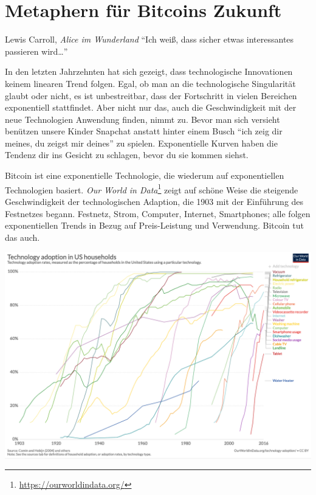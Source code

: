 \chapter{Metaphern für Bitcoins Zukunft}
\label{les:21}

\begin{chapquote}{Lewis Carroll, \textit{Alice im Wunderland}}
\enquote{Ich weiß, dass sicher etwas interessantes passieren wird\ldots}
\end{chapquote}

In den letzten Jahrzehnten hat sich gezeigt, dass technologische Innovationen
keinem linearen Trend folgen. Egal, ob man an die technologische Singularität
glaubt oder nicht, es ist unbestreitbar, dass der Fortschritt in vielen
Bereichen exponentiell stattfindet. Aber nicht nur das, auch die
Geschwindigkeit mit der neue Technologien Anwendung finden, nimmt zu. Bevor man
sich versieht benützen unsere Kinder Snapchat anstatt hinter einem Busch
\enquote{ich zeig dir meines, du zeigst mir deines} zu spielen. Exponentielle
Kurven haben die Tendenz dir ins Gesicht zu schlagen, bevor du sie kommen
siehst.

Bitcoin ist eine exponentielle Technologie, die wiederum auf exponentiellen
Technologien basiert. \textit{Our World in
Data}\footnote{\url{https://ourworldindata.org/}} zeigt auf schöne Weise die
steigende Geschwindigkeit der technologischen Adaption, die 1903 mit der
Einführung des Festnetzes begann. Festnetz, Strom, Computer, Internet,
Smartphones; alle folgen exponentiellen Trends in Bezug auf Preis-Leistung und
Verwendung. Bitcoin tut das auch.

\begin{center}
  \includegraphics[width=\textwidth]{assets/images/tech-adoption.png}
  \label{fig:tech-adoption}
\end{center}

